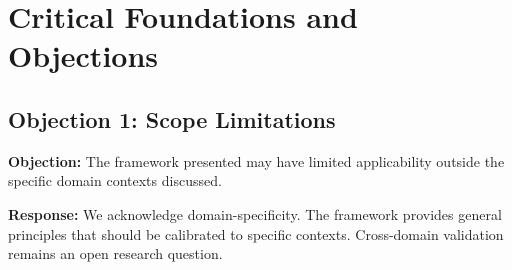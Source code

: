 %
%
%
%
%
%
%



\section{Critical Foundations and Objections}
\label{sec:llm-foundations}

\subsection{Objection 1: Scope Limitations}

\textbf{Objection:} The framework presented may have limited applicability
outside the specific domain contexts discussed.

\textbf{Response:} We acknowledge domain-specificity. The framework provides
general principles that should be calibrated to specific contexts. Cross-domain
validation remains an open research question.

